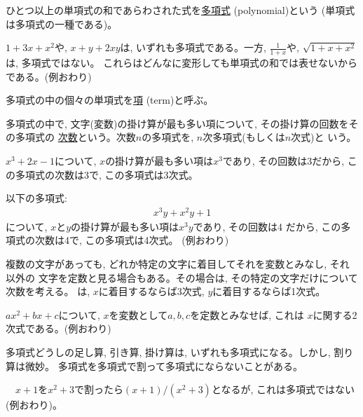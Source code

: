 ひとつ以上の単項式の和であらわされた式を\underline{多項式} (polynomial)という
(単項式は多項式の一種である)。

\begin{exmpl}
$1+3x+x^2$や, $x+y+2xy$は, いずれも多項式である。一方, 
$\frac{1}{1+x}$や, $\sqrt{1+x+x^2}$は, 多項式ではない。
これらはどんなに変形しても単項式の和では表せないからである。(例おわり)\end{exmpl}

多項式の中の個々の単項式を\underline{項} (term)と呼ぶ。

多項式の中で, 文字(変数)の掛け算が最も多い項について, その掛け算の回数をその多項式の
\underline{次数}という。次数$n$の多項式を, $n$次多項式(もしくは$n$次式)と
いう。

\begin{exmpl}  $x^3+2x-1$について, $x$の掛け算が最も多い項は$x^3$であり, その回数は3だから, 
この多項式の次数は3で, この多項式は3次式。\end{exmpl}

\begin{exmpl} 以下の多項式:
\begin{eqnarray}x^3y+x^2y+1\label{eq:exmple_poly0}\end{eqnarray}
について, $x$と$y$の掛け算が最も多い項は$x^3y$であり, その回数は4
だから, この多項式の次数は4で, この多項式は4次式。
(例おわり)\end{exmpl}

複数の文字があっても, どれか特定の文字に着目してそれを変数とみなし, それ以外の
文字を定数と見る場合もある。その場合は, その特定の文字だけについて次数を考える。
は, $x$に着目するならば3次式, $y$に着目するならば1次式。

\begin{exmpl}  $ax^2+bx+c$について, $x$を変数として$a, b, c$を定数とみなせば, これは
$x$に関する2次式である。(例おわり)\end{exmpl}

多項式どうしの足し算, 引き算, 掛け算は, いずれも多項式になる。しかし, 割り算は微妙。
多項式を多項式で割って多項式にならないことがある。

\begin{exmpl}　$x+1$を$x^2+3$で割ったら$(x+1)/(x^2+3)$となるが, 
これは多項式ではない(例おわり)。\end{exmpl}

